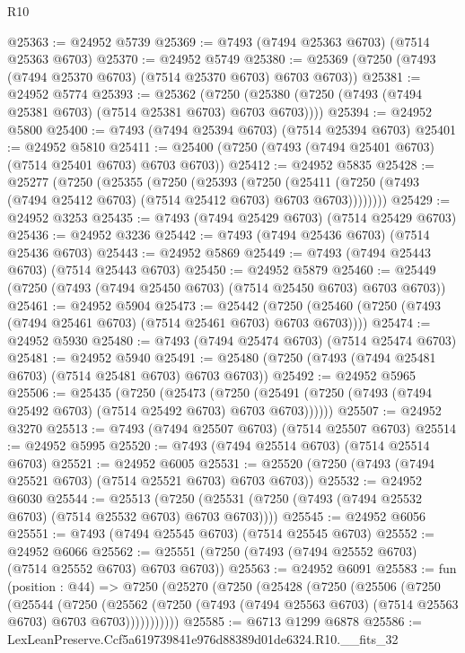 \begin{lexlean}{R10}
\begin{coremodule}
@25363 := @24952 @5739
@25369 := @7493 (@7494 @25363 @6703) (@7514 @25363 @6703)
@25370 := @24952 @5749
@25380 := @25369 (@7250 (@7493 (@7494 @25370 @6703) (@7514 @25370 @6703) @6703 @6703))
@25381 := @24952 @5774
@25393 := @25362
    (@7250 (@25380 (@7250 (@7493 (@7494 @25381 @6703) (@7514 @25381 @6703) @6703 @6703))))
@25394 := @24952 @5800
@25400 := @7493 (@7494 @25394 @6703) (@7514 @25394 @6703)
@25401 := @24952 @5810
@25411 := @25400 (@7250 (@7493 (@7494 @25401 @6703) (@7514 @25401 @6703) @6703 @6703))
@25412 := @24952 @5835
@25428 := @25277
    (@7250
      (@25355
        (@7250
          (@25393
            (@7250
              (@25411 (@7250 (@7493 (@7494 @25412 @6703) (@7514 @25412 @6703) @6703 @6703))))))))
@25429 := @24952 @3253
@25435 := @7493 (@7494 @25429 @6703) (@7514 @25429 @6703)
@25436 := @24952 @3236
@25442 := @7493 (@7494 @25436 @6703) (@7514 @25436 @6703)
@25443 := @24952 @5869
@25449 := @7493 (@7494 @25443 @6703) (@7514 @25443 @6703)
@25450 := @24952 @5879
@25460 := @25449 (@7250 (@7493 (@7494 @25450 @6703) (@7514 @25450 @6703) @6703 @6703))
@25461 := @24952 @5904
@25473 := @25442
    (@7250 (@25460 (@7250 (@7493 (@7494 @25461 @6703) (@7514 @25461 @6703) @6703 @6703))))
@25474 := @24952 @5930
@25480 := @7493 (@7494 @25474 @6703) (@7514 @25474 @6703)
@25481 := @24952 @5940
@25491 := @25480 (@7250 (@7493 (@7494 @25481 @6703) (@7514 @25481 @6703) @6703 @6703))
@25492 := @24952 @5965
@25506 := @25435
    (@7250
      (@25473
        (@7250 (@25491 (@7250 (@7493 (@7494 @25492 @6703) (@7514 @25492 @6703) @6703 @6703))))))
@25507 := @24952 @3270
@25513 := @7493 (@7494 @25507 @6703) (@7514 @25507 @6703)
@25514 := @24952 @5995
@25520 := @7493 (@7494 @25514 @6703) (@7514 @25514 @6703)
@25521 := @24952 @6005
@25531 := @25520 (@7250 (@7493 (@7494 @25521 @6703) (@7514 @25521 @6703) @6703 @6703))
@25532 := @24952 @6030
@25544 := @25513
    (@7250 (@25531 (@7250 (@7493 (@7494 @25532 @6703) (@7514 @25532 @6703) @6703 @6703))))
@25545 := @24952 @6056
@25551 := @7493 (@7494 @25545 @6703) (@7514 @25545 @6703)
@25552 := @24952 @6066
@25562 := @25551 (@7250 (@7493 (@7494 @25552 @6703) (@7514 @25552 @6703) @6703 @6703))
@25563 := @24952 @6091
@25583 := fun (position : @44) =>
  @7250
    (@25270
      (@7250
        (@25428
          (@7250
            (@25506
              (@7250
                (@25544
                  (@7250
                    (@25562
                      (@7250 (@7493 (@7494 @25563 @6703) (@7514 @25563 @6703) @6703 @6703)))))))))))
@25585 := @6713 @1299 @6878
@25586 := LexLeanPreserve.Ccf5a619739841e976d88389d01de6324.R10.__fits_32

\end{coremodule}
\end{lexlean}
